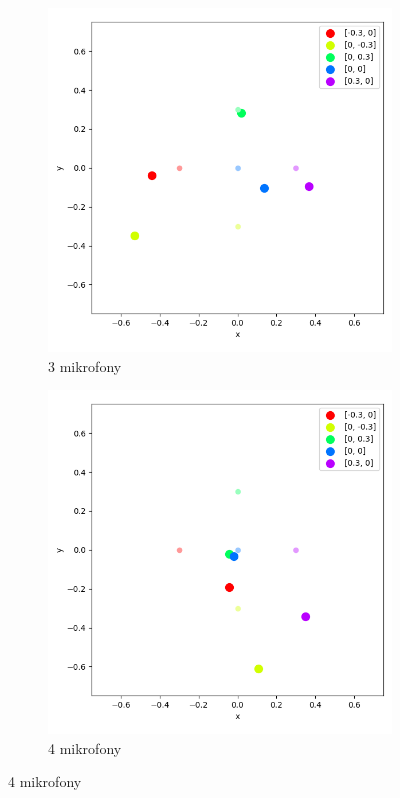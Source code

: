 \begin{figure}[H]
    \centering
    \begin{subfigure}{.5\textwidth}
        \centering
        \includegraphics[width=\linewidth]{pics/mult_lat_2d_num/positions_3_mean.png}
        \caption{3 mikrofony}
        \label{pic:2d_3_num_mult}
    \end{subfigure}%
    \begin{subfigure}{.5\textwidth}
        \centering
        \includegraphics[width=\linewidth]{pics/mult_lat_2d_num/positions_4_mean.png}
        \caption{4 mikrofony}
        \label{pic:2d_4_num_mult}
    \end{subfigure}
\end{figure}
